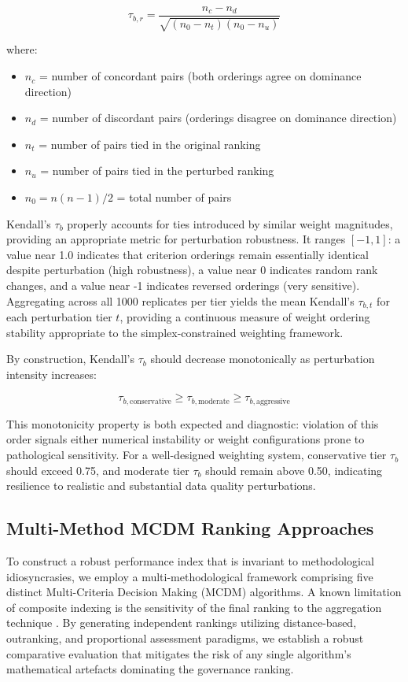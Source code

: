\documentclass[12pt,a4paper]{article}
\begin{document}
\begin{equation}
\tau_{b,r} = \frac{n_c - n_d}{\sqrt{(n_0 - n_t)(n_0 - n_u)}}
\end{equation}

where:
\begin{itemize}
  \item $n_c$ = number of concordant pairs (both orderings agree on dominance direction)
  \item $n_d$ = number of discordant pairs (orderings disagree on dominance direction)
  \item $n_t$ = number of pairs tied in the original ranking
  \item $n_u$ = number of pairs tied in the perturbed ranking
  \item $n_0 = n(n-1)/2$ = total number of pairs
\end{itemize}

Kendall's $\tau_b$ properly accounts for ties introduced by similar weight magnitudes, providing an appropriate metric for perturbation robustness. It ranges $[-1, 1]$: a value near 1.0 indicates that criterion orderings remain essentially identical despite perturbation (high robustness), a value near 0 indicates random rank changes, and a value near -1 indicates reversed orderings (very sensitive). Aggregating across all 1000 replicates per tier yields the mean Kendall's $\tau_{b,t}$ for each perturbation tier $t$, providing a continuous measure of weight ordering stability appropriate to the simplex-constrained weighting framework.

By construction, Kendall's $\tau_b$ should decrease monotonically as perturbation intensity increases:

$$\tau_{b,\text{conservative}} \geq \tau_{b,\text{moderate}} \geq \tau_{b,\text{aggressive}}$$

This monotonicity property is both expected and diagnostic: violation of this order signals either numerical instability or weight configurations prone to pathological sensitivity. For a well-designed weighting system, conservative tier $\tau_b$ should exceed 0.75, and moderate tier $\tau_b$ should remain above 0.50, indicating resilience to realistic and substantial data quality perturbations.

\subsection{Multi-Method MCDM Ranking Approaches}
\label{subsec:mcdm}

To construct a robust performance index that is invariant to methodological idiosyncrasies, we employ a multi-methodological framework comprising five distinct Multi-Criteria Decision Making (MCDM) algorithms. A known limitation of composite indexing is the sensitivity of the final ranking to the aggregation technique \citep{Greco2016}. By generating independent rankings utilizing distance-based, outranking, and proportional assessment paradigms, we establish a robust comparative evaluation that mitigates the risk of any single algorithm's mathematical artefacts dominating the governance ranking.
\end{document}
